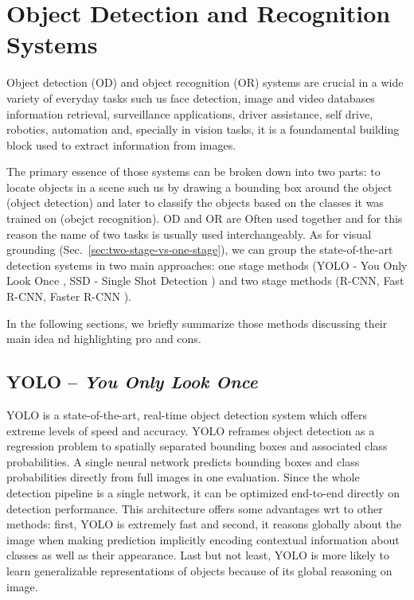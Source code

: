 \section{Object Detection and Recognition Systems}
\label{sec:object-detection-recognition}

Object detection (OD) and object recognition (OR) systems are crucial
in a wide variety of everyday tasks such us face detection, image and
video databases information retrieval, surveillance applications,
driver assistance, self drive, robotics, automation and, specially in
vision tasks, it is a foundamental building block used to extract
information from images.

The primary essence of those systems can be broken down into two
parts: to locate objects in a scene such us by drawing a bounding box
around the object (object detection) and later to classify the objects
based on the classes it was trained on (obejct recognition). OD and OR
are Often used together and for this reason the name of two tasks is
usually used interchangeably. As for visual grounding
(Sec.~\ref{sec:two-stage-vs-one-stage}), we can group the
state-of-the-art detection systems in two main approaches: one stage
methods (YOLO - You Only Look Once , SSD - Single
Shot Detection ) and two stage methods (R-CNN, Fast
R-CNN, Faster R-CNN ). 

In the following sections, we briefly summarize those methods
discussing their main idea nd highlighting pro and cons.

\subsection{YOLO -- \emph{You Only Look Once}}

YOLO is a state-of-the-art, real-time object detection system which
offers extreme levels of speed and accuracy. YOLO reframes object
detection as a regression problem to spatially separated bounding
boxes and associated class probabilities. A single neural network
predicts bounding boxes and class probabilities directly from full
images in one evaluation. Since the whole detection pipeline is a
single network, it can be optimized end-to-end directly on detection
performance. This architecture offers some advantages wrt to other
methods: first, YOLO is extremely fast and second, it reasons globally
about the image when making prediction implicitly encoding contextual
information about classes as well as their appearance. Last but not
least, YOLO is more likely to learn generalizable representations of
objects because of its global reasoning on image.

